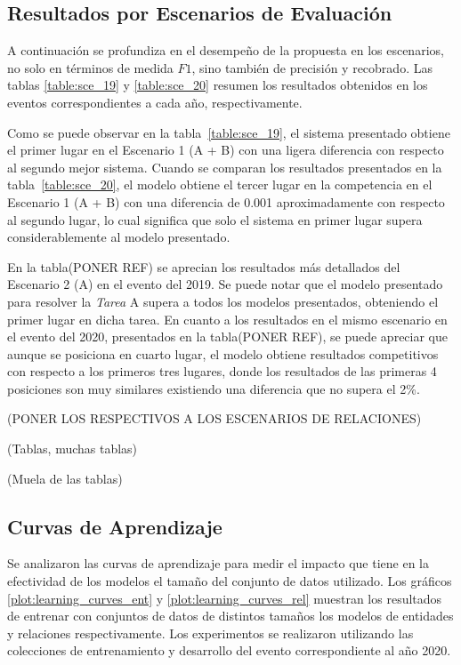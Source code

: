 \subsection{Resultados por Escenarios de Evaluación}

A continuación se profundiza en el desempeño de la propuesta en los escenarios, no solo en términos de medida $F1$, sino también de precisión y recobrado.
Las tablas \ref{table:sce_19} y \ref{table:sce_20} resumen los resultados obtenidos en los eventos correspondientes a cada año, respectivamente.

Como se puede observar en la tabla~\ref{table:sce_19}, el sistema presentado obtiene el primer lugar en el Escenario 1 (A + B) con una ligera diferencia con respecto al segundo mejor sistema. Cuando se comparan los resultados presentados en la tabla~\ref{table:sce_20}, el modelo obtiene el tercer lugar en la competencia en el Escenario 1 (A + B) con una diferencia de 0.001 aproximadamente con respecto al segundo lugar, lo cual significa que solo el sistema en primer lugar supera considerablemente al modelo presentado.

En la tabla(PONER REF) se aprecian los resultados m\'as detallados del Escenario 2 (A) en el evento del 2019. Se puede notar que el modelo presentado para resolver la \emph{Tarea} A supera a todos los modelos presentados, obteniendo el primer lugar en dicha tarea. En cuanto a los resultados en el mismo escenario en el evento del 2020, presentados en la tabla(PONER REF), se puede apreciar que aunque se posiciona en cuarto lugar, el modelo obtiene resultados competitivos con respecto a los primeros tres lugares, donde los resultados de las primeras 4 posiciones son muy similares existiendo una diferencia que no supera el 2\%.

(PONER LOS RESPECTIVOS A LOS ESCENARIOS DE RELACIONES)
 
(Tablas, muchas tablas)

(Muela de las tablas)

\subsection{Curvas de Aprendizaje}

Se analizaron las curvas de aprendizaje para medir el impacto que tiene en la efectividad de los modelos el tamaño del conjunto de datos utilizado.
Los gráficos \ref{plot:learning_curves_ent} y \ref{plot:learning_curves_rel} muestran los resultados de entrenar con conjuntos de datos de distintos tamaños los modelos de entidades y relaciones respectivamente.
Los experimentos se realizaron utilizando las colecciones de entrenamiento y desarrollo del evento correspondiente al año 2020.

